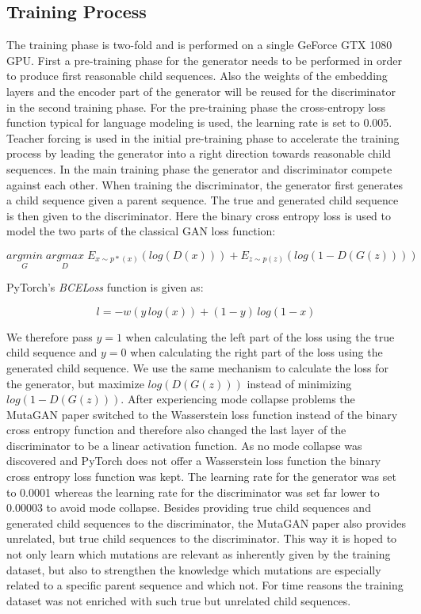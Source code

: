 \subsection{Training Process} \label{approachD}

The training phase is two-fold and is performed on a single GeForce GTX 1080 \ac{GPU}. First a pre-training phase for the generator needs to be performed in order to produce first reasonable child sequences. Also the weights of the embedding layers and the encoder part of the generator will be reused for the discriminator in the second training phase. For the pre-training phase the cross-entropy loss function typical for language modeling is used, the learning rate is set to 0.005. Teacher forcing is used in the initial pre-training phase to accelerate the training process by leading the generator into a right direction towards reasonable child sequences. In the main training phase the generator and discriminator compete against each other. When training the discriminator, the generator first generates a child sequence given a parent sequence. The true and generated child sequence is then given to the discriminator. Here the binary cross entropy loss is used to model the two parts of the classical \ac{GAN} loss function: 

\begin{equation}
	\underset{G}{arg min} \; \underset{D}{arg max} \; E_{x \sim p*(x)}(log(D(x))) + E_{z \sim p(z)}(log(1-D(G(z))))
\end{equation}

PyTorch's \textit{BCELoss} function is given as:

\begin{equation}
	l = -w(y\,log(x)) + (1-y)\,log(1-x)
\end{equation}

We therefore pass $y=1$ when calculating the left part of the loss using the true child sequence and $y=0$ when calculating the right part of the loss using the generated child sequence. We use the same mechanism to calculate the loss for the generator, but maximize $log(D(G(z)))$ instead of minimizing $log(1-D(G(z)))$. After experiencing mode collapse problems the MutaGAN paper \cite{Berman2020} switched to the Wasserstein loss function instead of the binary cross entropy function and therefore also changed the last layer of the discriminator to be a linear activation function. As no mode collapse was discovered and PyTorch does not offer a Wasserstein loss function the binary cross entropy loss function was kept. The learning rate for the generator was set to 0.0001 whereas the learning rate for the discriminator was set far lower to 0.00003 to avoid mode collapse. Besides providing true child sequences and generated child sequences to the discriminator, the MutaGAN paper \cite{Berman2020} also provides unrelated, but true child sequences to the discriminator. This way it is hoped to not only learn which mutations are relevant as inherently given by the training dataset, but also to strengthen the knowledge which mutations are especially related to a specific parent sequence and which not. For time reasons the training dataset was not enriched with such true but unrelated child sequences. 


